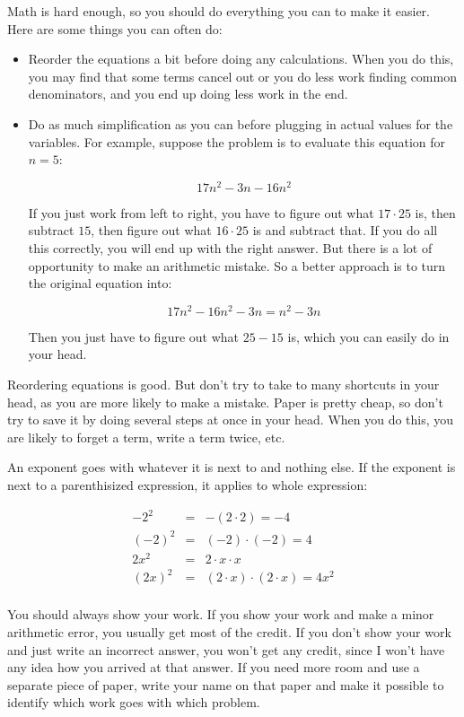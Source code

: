 \documentclass[fleqn,addpoints]{exam}
\begin{document}
  \begin{em}
    Math is hard enough, so you should do everything you can to make it easier.  Here are some things you can often do:
    \begin{itemize}
      \item Reorder the equations a bit before doing any calculations.  When you do this, you may find that
            some terms cancel out or you do less work finding common denominators, and you end up doing less work in
            the end. 

      \item Do as much simplification as you can before plugging in actual values for the variables.  For example,
        suppose the problem is to evaluate this equation for \( n = 5 \):
        
        \[ 17n^2 - 3n - 16n^2 \]

        If you just work from left to right, you have to figure out what \( 17 \cdot 25 \) is, then subtract \( 15 \),
        then figure out what \( 16 \cdot 25 \) is and subtract that.  If you do all this correctly, you will end up with
        the right answer.  But there is a lot of opportunity to make an arithmetic mistake.  So a better approach is to
        turn the original equation into:

        \[ 17n^2 - 16n^2 - 3n = n^2 - 3n \]

        Then you just have to figure out what \( 25 - 15 \) is, which you can easily do in your head.
    \end{itemize}

    Reordering equations is good.  But don't try to take to many shortcuts in your head, as you are more likely to make
    a mistake.  Paper is pretty cheap, so don't try to save it by doing several steps at once in your head.  When you do
    this, you are likely to forget a term, write a term twice, etc.

    An exponent goes with whatever it is next to and nothing else.  If the exponent is next to a parenthisized
    expression, it applies to whole expression:

    \begin{eqnarray*}
      -2^2 & = & - (2 \cdot 2) = -4 \\
      (-2)^2 & = & (-2) \cdot (-2) = 4 \\
      2x^2 & = & 2 \cdot x \cdot x \\
      (2x)^2 & = & (2 \cdot x) \cdot (2 \cdot x) = 4x^2 \\
    \end{eqnarray*}

    You should always show your work.  If you show your work and make a minor arithmetic error, you usually get most of
    the credit.  If you don't show your work and just write an incorrect answer, you won't get any credit, since I won't
    have any idea how you arrived at that answer.  If you need more room and use a separate piece of paper, write your
    name on that paper and make it possible to identify which work goes with which problem.

  \end{em}
\end{document}
